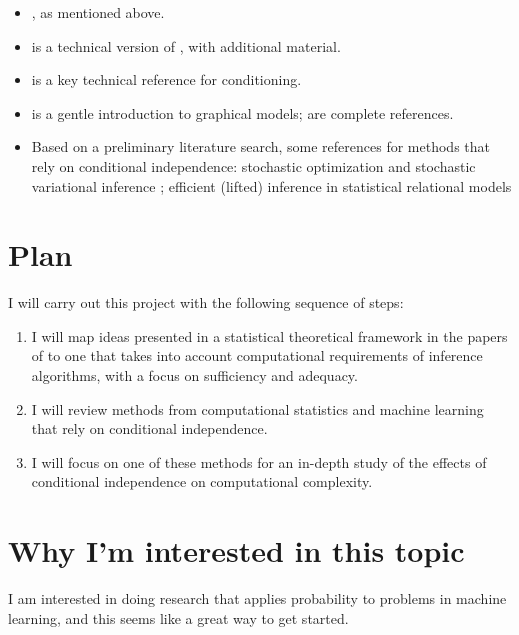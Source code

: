 \documentclass[]{STAT_547C}
\begin{document}
\begin{itemize}
  \item \cite{Dawid:1980:CondIndStatOp}, as mentioned above.
  \item \cite{Dawid:1979:CondIndStatTheory} is a technical version of \cite{Dawid:1980:CondIndStatOp}, with additional material.
  \item \cite[][Ch.~6]{Kallenberg:2002} is a key technical reference for conditioning.
  \item \cite[][Ch.~8]{Bishop:2006} is a gentle introduction to graphical models; \cite{Lauritzen:1996:GraphMod,Koller:Friedman:2009:PGM} are complete references.
  \item Based on a preliminary literature search, some references for methods that rely on conditional independence: stochastic optimization \cite{Bottou:2010} and stochastic variational inference \cite{Hoffman:etal:2013:SVI}; efficient (lifted) inference in statistical relational models \cite{Niepert:Domingos,Niepert:vdBroeck:2014:TractExch}
\end{itemize}


\section{Plan}

I will carry out this project with the following sequence of steps: 
\begin{enumerate}
  \item I will map ideas presented in a statistical theoretical framework in the papers of \citet{Dawid:1979:CondIndStatTheory,Dawid:1980:CondIndStatOp} to one that takes into account computational requirements of  inference algorithms, with a focus on sufficiency and adequacy.
  \item I will review methods from computational statistics and machine learning that rely on conditional independence. 
  \item I will focus on one of these methods for an in-depth study of the effects of conditional independence on computational complexity.
\end{enumerate}


\section{Why I'm interested in this topic}

I am interested in doing research that applies probability to problems in machine learning, and this seems like a great way to get started. 


\printbibliography
\end{document}
